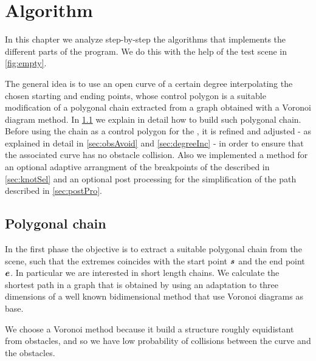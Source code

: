 \documentclass[dissertation.tex]{subfiles}
\begin{document}
\chapter{Algorithm}
In this chapter we analyze step-by-step the algorithms that implements
the different parts of the program. We do this with the help of the
test scene in \cref{fig:empty}.

The general idea is to use an open \bs curve of a certain degree
interpolating the chosen starting and ending points, whose
control polygon is a suitable modification of a polygonal chain
extracted from a graph
obtained with a Voronoi diagram method. In \cref{sec:polChain} we
explain in detail how to
build such polygonal chain. Before using the chain as a control
polygon for the \bs, it is refined and adjusted - as explained in
detail in \cref{sec:obsAvoid} and \cref{sec:degreeInc} - in order to
ensure that the associated \bs curve has no obstacle
collision. Also we implemented a method for an optional adaptive
arrangment of the breakpoints of the \bs described in
\cref{sec:knotSel} and an optional post processing for the
simplification of the path described in \cref{sec:postPro}.
\section{Polygonal chain}\label{sec:polChain}
In the first phase the objective is to extract a suitable polygonal chain from
the scene, such that the extremes coincides with the start point $\boldsymbol{s}$
and the end point $\boldsymbol{e}$. In particular we are interested in short length
chains. We calculate the shortest path
in a graph that is obtained by using an adaptation to three
dimensions of a well known bidimensional method
\cite{bhattacharya}\cite{ho-liu}\cite{seda-pich} that use
Voronoi diagrams as base.

We choose a Voronoi method because it build a structure roughly
equidistant from obstacles, and so we have low probability of
collisions between the curve and the obstacles.
\end{document}
